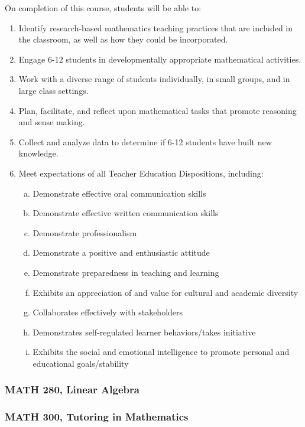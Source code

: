 \documentclass[11pt]{article}
\newenvironment{alphalist}{
  \begin{enumerate}[(1)]
    \addtolength{\itemsep}{-1.0\itemsep}}
  {\end{enumerate}}
\newenvironment{betalist}{
  \begin{enumerate}[(a)]
    \addtolength{\itemsep}{-1.0\itemsep}}
  {\end{enumerate}}
\begin{document}
On completion of this course, students will be able to:
\begin{alphalist}
\item Identify research-based mathematics teaching practices that are included in the classroom, as well as how they could be incorporated.
\item Engage 6-12 students in developmentally appropriate mathematical activities. 
\item Work with a diverse range of students individually, in small groups, and in large class settings.
\item Plan, facilitate, and reflect upon mathematical tasks that promote reasoning and sense making.
\item Collect and analyze data to determine if 6-12 students have built new knowledge.
\item Meet expectations of all Teacher Education Dispositions, including:
\begin{betalist}
    \item Demonstrate effective oral communication skills
    \item Demonstrate effective written communication skills
    \item Demonstrate professionalism
    \item Demonstrate a positive and enthusiastic attitude
    \item Demonstrate preparedness in teaching and learning
    \item Exhibits an appreciation of and value for cultural and academic diversity
    \item Collaborates effectively with stakeholders
    \item Demonstrates self-regulated learner behaviors/takes initiative
    \item Exhibits the social and emotional intelligence to promote personal and educational goals/stability
\end{betalist}
\end{alphalist}

\subsubsection*{MATH 280, Linear Algebra}



\subsubsection*{MATH 300, Tutoring in Mathematics}
\end{document}
